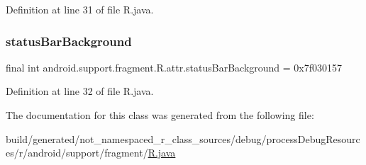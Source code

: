 Definition at line 31 of file R.\+java.

\mbox{\label{classandroid_1_1support_1_1fragment_1_1_r_1_1attr_a6bf491fb07f26af1dcd59e25a7fa709a}} 
\subsubsection{\texorpdfstring{statusBarBackground}{statusBarBackground}}
{\footnotesize\ttfamily final int android.\+support.\+fragment.\+R.\+attr.\+status\+Bar\+Background = 0x7f030157\hspace{0.3cm}{\ttfamily [static]}}



Definition at line 32 of file R.\+java.



The documentation for this class was generated from the following file\+:\begin{DoxyCompactItemize}
\item 
build/generated/not\+\_\+namespaced\+\_\+r\+\_\+class\+\_\+sources/debug/process\+Debug\+Resources/r/android/support/fragment/\mbox{\hyperlink{android_2support_2fragment_2_r_8java}{R.\+java}}\end{DoxyCompactItemize}
